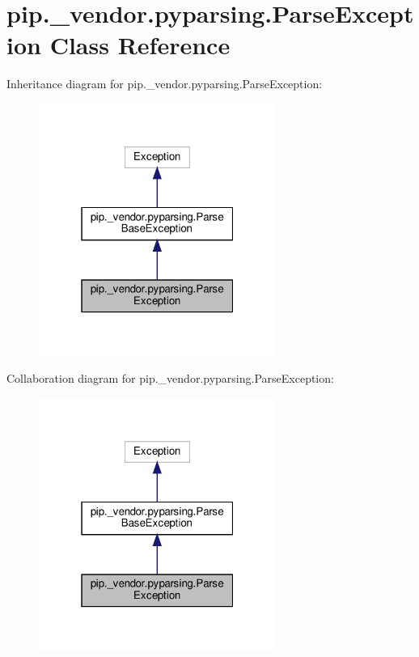 \hypertarget{classpip_1_1__vendor_1_1pyparsing_1_1ParseException}{}\section{pip.\+\_\+vendor.\+pyparsing.\+Parse\+Exception Class Reference}
\label{classpip_1_1__vendor_1_1pyparsing_1_1ParseException}


Inheritance diagram for pip.\+\_\+vendor.\+pyparsing.\+Parse\+Exception\+:
\nopagebreak
\begin{figure}[H]
\begin{center}
\leavevmode
\includegraphics[width=220pt]{classpip_1_1__vendor_1_1pyparsing_1_1ParseException__inherit__graph}
\end{center}
\end{figure}


Collaboration diagram for pip.\+\_\+vendor.\+pyparsing.\+Parse\+Exception\+:
\nopagebreak
\begin{figure}[H]
\begin{center}
\leavevmode
\includegraphics[width=220pt]{classpip_1_1__vendor_1_1pyparsing_1_1ParseException__coll__graph}
\end{center}
\end{figure}
